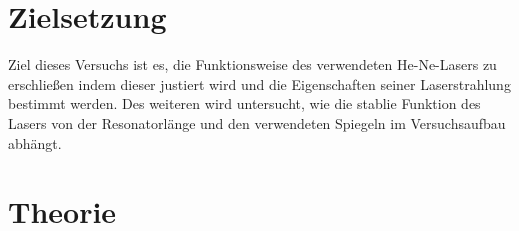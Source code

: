 \section{Zielsetzung}\label{sec:zielsetzung}
Ziel dieses Versuchs ist es, die Funktionsweise des verwendeten He-Ne-Lasers zu erschließen indem dieser justiert wird und die Eigenschaften seiner Laserstrahlung bestimmt werden. Des weiteren wird untersucht, wie die stablie Funktion des Lasers von der Resonatorlänge und den verwendeten Spiegeln im Versuchsaufbau abhängt.

\section{Theorie}\label{sec:theorie}

